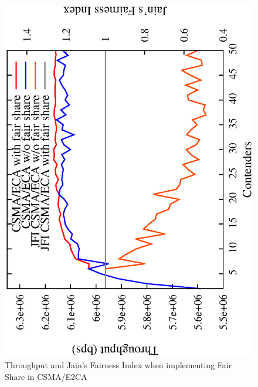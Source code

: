 


\begin{figure}[htbp]
  \centering
  \includegraphics[width=0.7\linewidth, angle = -90]{figures/throughput/CSMA-E2CA_w_fairShare.eps}
  \caption{Throughput and Jain's Fairness Index when implementing Fair Share in CSMA/E2CA
  \label{fig:fairShare}}
\end{figure}

